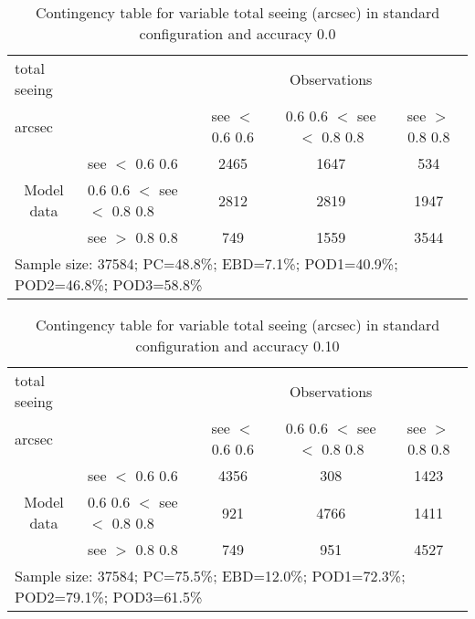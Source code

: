 \documentclass[11pt,english]{article}
\begin{document}
\newpage

\clearpage
\begin{table}[]
\begin{center}
\begin{tabular}{llccc}
\hline
{total seeing}                                       &                                                    & \multicolumn{3}{c}{Observations}                 \\
{arcsec}                                       &                             & see $<$ 0.6
0.6   & 0.6
0.6 $<$ see $<$ 0.8
0.8 & see $>$ 0.8
0.8 \\
\hline
\multicolumn{1}{c}{\multirow{3}{*}{Model data}}  & see $<$ 0.6
0.6             & 2465                & 1647                       & 534              \\
                                                 & 0.6
0.6  $<$ see $<$ 0.8
0.8 & 2812                & 2819                       & 1947              \\
                                                 & see $>$ 0.8
0.8             & 749                & 1559                       & 3544              \\
\hline
\multicolumn{5}{l}{Sample size: 37584; PC=48.8\%; EBD=7.1\%; POD1=40.9\%; POD2=46.8\%; POD3=58.8\%}
\end{tabular}
\end{center}
\caption{Contingency table for variable total seeing (arcsec) in standard configuration and accuracy 0.0}
\label{tab:contingencyseeBEF}
\end{table}
\begin{table}[]
\begin{center}
\begin{tabular}{llccc}
\hline
{total seeing}                                       &                                                    & \multicolumn{3}{c}{Observations}                 \\
{arcsec}                                       &                             & see $<$ 0.6
0.6   & 0.6
0.6 $<$ see $<$ 0.8
0.8 & see $>$ 0.8
0.8 \\
\hline
\multicolumn{1}{c}{\multirow{3}{*}{Model data}}  & see $<$ 0.6
0.6             & 4356                & 308                       & 1423              \\
                                                 & 0.6
0.6  $<$ see $<$ 0.8
0.8 & 921                & 4766                       & 1411              \\
                                                 & see $>$ 0.8
0.8             & 749                & 951                       & 4527              \\
\hline
\multicolumn{5}{l}{Sample size: 37584; PC=75.5\%; EBD=12.0\%; POD1=72.3\%; POD2=79.1\%; POD3=61.5\%}
\end{tabular}
\end{center}
\caption{Contingency table for variable total seeing (arcsec) in standard configuration and accuracy 0.10}
\label{tab:contingencyseeBEF}
\end{table}
\end{document}
